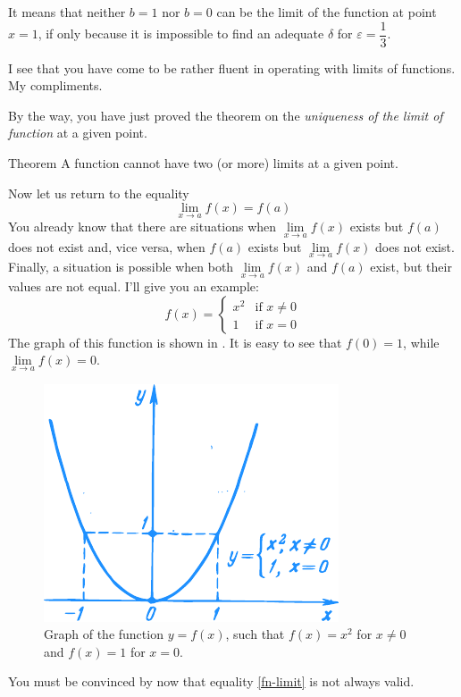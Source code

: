{It means that neither $b= 1$ nor $b=0$ can be the limit of the function at point $x = 1$, if only because it is impossible to find an adequate $\delta$ for  $\varepsilon =\dfrac{1}{3}$.

\athr I see that you have come to be rather fluent in operating with limits of functions. My compliments.

By the way, you have just proved the theorem on the \emph{uniqueness of the limit of function} at a given point.
\begin{mytheo}{Theorem}
A function cannot have two (or more) limits at a given point.
\end{mytheo}
Now let us return to the equality
\begin{equation}%
\lim\limits_{x \to a} f(x) = f(a)
\label{fn-limit}
\end{equation}
You already know that there are situations when $\lim\limits_{x \to a} f(x)$ exists but $f (a)$ does not exist and, vice versa, when $f (a)$
exists but $\lim\limits_{x \to a} f(x)$ does not exist. Finally, a situation is
possible when both $\lim\limits_{x \to a} f(x)$ and $f (a)$ exist, but their 
values are not equal. I'll give you an example: 
\begin{equation*}%
f(x)=
\begin{cases}
 x^{2} & \text{if} \,\, x \neq 0\\
 1 & \text{if} \,\, x=0
 \end{cases}
 \end{equation*}
  The graph of this function is shown in . It is easy
to see that $f(0) = 1$, while $\lim\limits_{x \to a} f(x) =0$.
  
  \begin{figure}[!ht]%
\centering
\includegraphics[width=.6\textwidth]{figures/fig-28.pdf}
\caption{Graph of the function $y = f(x)$, such that $f(x) = x^{2}$ for $x \neq 0$ and $f(x) = 1$ for $x = 0$.}
\label{fig-28}
\end{figure}
You must be convinced by now that equality \eqref{fn-limit} is not always valid.

}
